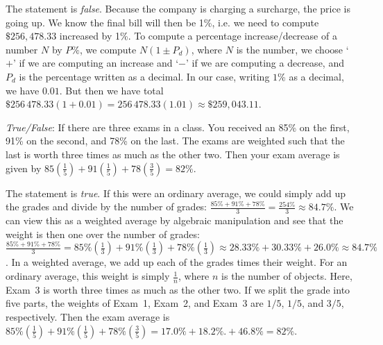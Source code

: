 \documentclass[11pt,letterpaper]{article}
\begin{document}
\sol The statement is \textit{false}. Because the company is charging a surcharge, the price is going up. We know the final bill will then be 1\%, i.e. we need to compute $\$256,478.33$ increased by 1\%. To compute a percentage increase/decrease of a number $N$ by $P\%$, we compute $N( 1 \pm P_d)$, where $N$ is the number, we choose `$+$' if we are computing an increase and `$-$' if we are computing a decrease, and $P_d$ is the percentage written as a decimal. In our case, writing $1$\% as a decimal, we have $0.01$. But then we have total $\$256\,478.33(1 + 0.01)= 256\,478.33(1.01) \approx \$259,043.11$.





\newpage





\quizsol \textit{True/False}: If there are three exams in a class. You received an 85\% on the first, 91\% on the second, and 78\% on the last. The exams are weighted such that the last is worth three times as much as the other two. Then your exam average is given by $85 \left( \frac{1}{5} \right) + 91 \left( \frac{1}{5} \right) + 78 \left( \frac{3}{5} \right)= 82\%$. \pspace

\sol The statement is \textit{true}. If this were an ordinary average, we could simply add up the grades and divide by the number of grades: $\frac{85\% + 91\% + 78\%}{3}= \frac{254\%}{3} \approx 84.7\%$. We can view this as a weighted average by algebraic manipulation and see that the weight is then one over the number of grades: $\frac{85\% + 91\% + 78\%}{3}= 85\% (\frac{1}{3}) + 91\% (\frac{1}{3}) + 78\% (\frac{1}{3}) \approx 28.33\% + 30.33\% + 26.0\% \approx 84.7\%$. In a weighted average, we add up each of the grades times their weight. For an ordinary average, this weight is simply $\frac{1}{n}$, where $n$ is the number of objects. Here, Exam~3 is worth three times as much as the other two. If we split the grade into five parts, the weights of Exam~1, Exam~2, and Exam~3 are $1/5$, $1/5$, and $3/5$, respectively. Then the exam average is $85\% (\frac{1}{5}) + 91\% (\frac{1}{5}) + 78\% (\frac{3}{5})= 17.0\% + 18.2\%.+ 46.8\%= 82\%$. 




\end{document}
